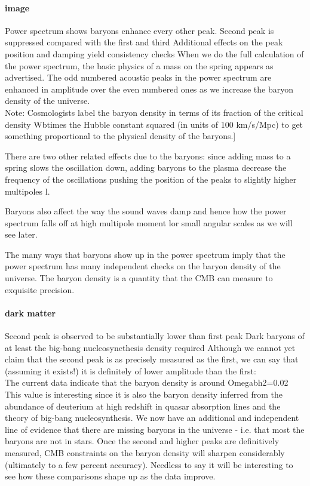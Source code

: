 \documentclass{article}
\begin{document}
\paragraph{image}
Power spectrum shows baryons enhance every other peak.
Second peak is suppressed compared with the first and third
Additional effects on the peak position and damping yield consistency checks
When we do the full calculation of the power spectrum, the basic physics of a mass on the spring appears as advertised.   The odd numbered acoustic peaks in the power spectrum are enhanced in amplitude over the even numbered ones as we increase the baryon density of the universe.\\
Note: Cosmologists label the baryon density in terms of its fraction of the critical density Wbtimes the Hubble constant squared (in units of 100 km/s/Mpc) to get something proportional to the physical density of the baryons.]

There are two other related effects due to the baryons:  since adding mass to a spring slows the oscillation down, adding baryons to the plasma decrease the frequency of the oscillations pushing the position of the peaks to slightly higher multipoles l.

Baryons also affect the way the sound waves damp and hence how the power spectrum falls off at high multipole moment lor small angular scales as we will see later.

The many ways that baryons show up in the power spectrum imply that the power spectrum has many independent checks on the baryon density of the universe.  The baryon density is a quantity that the CMB can measure to exquisite precision.

\paragraph{dark matter}
Second peak is observed to be substantially lower than first peak
Dark baryons of at least the big-bang nucleosynethesis density required
Although we cannot yet claim that the second peak is as precisely measured as the first, we can say that (assuming it exists!) it is definitely of lower amplitude than the first:\\
The current data indicate that the baryon density is around Omegabh2=0.02 This value is interesting since it is also the baryon density inferred from the abundance of deuterium at high redshift in quasar absorption lines and the theory of big-bang nucleosynthesis.  We now have an additional and independent line of evidence that there are missing baryons in the universe - i.e. that most the baryons are not in stars.   Once the second and higher peaks are definitively measured, CMB constraints on the baryon density will sharpen considerably (ultimately to a few percent accuracy).  Needless to say it will be interesting to see how these comparisons shape up as the data improve.
\end{document}
